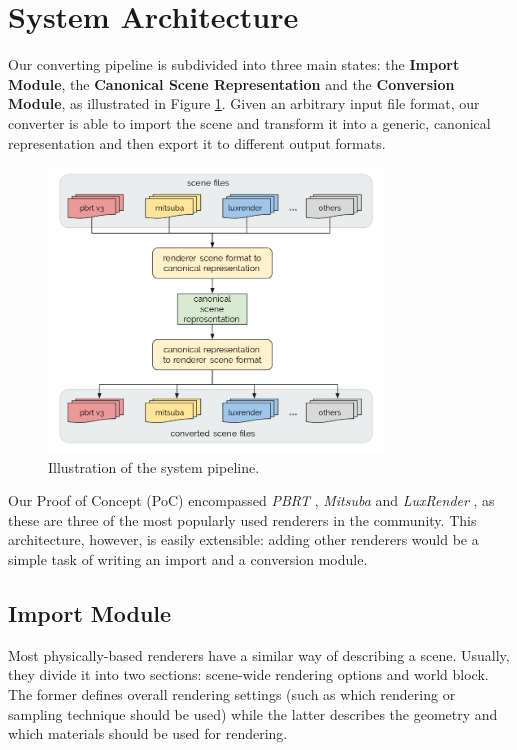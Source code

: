 \section{System Architecture} 
\label{sec:systemarch}

Our converting pipeline is subdivided into three main states: the \textbf{Import
Module}, the \textbf{Canonical Scene Representation} and the \textbf{Conversion
Module}, as illustrated in Figure \ref{fig:sysarch}. Given an arbitrary input
file format, our converter is able to import the scene and transform it into a
generic, canonical representation and then export it to different output
formats.

\begin{figure}[h]
\centering
\includegraphics[width=3.5in]{figs/3_system_architecture/architecture.png}
\caption{Illustration of the system pipeline.}
\label{fig:sysarch}
\end{figure}

Our Proof of Concept (PoC) encompassed \textit{PBRT} \cite{pbrt}, \textit{Mitsuba}
\cite{mitsuba} and \textit{LuxRender} \cite{luxrender}, as these are three of
the most popularly used renderers in the community. This architecture, however,
is easily extensible: adding other renderers would be a simple task of writing
an import and a conversion module.

\subsection{Import Module}
Most physically-based renderers have a similar way of describing a scene.
Usually, they divide it into two sections: scene-wide rendering options and
world block. The former defines overall rendering settings (such as which
rendering or sampling technique should be used) while the latter describes the
geometry and which materials should be used for rendering.

